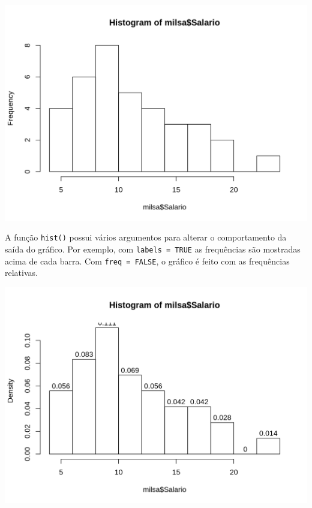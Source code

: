 \documentclass[10pt,a4paper]{book}
\newenvironment{Shaded}{\begin{snugshade}}{\end{snugshade}}
\newcommand{\KeywordTok}[1]{\textcolor[rgb]{0.13,0.29,0.53}{\textbf{#1}}}
\newcommand{\DataTypeTok}[1]{\textcolor[rgb]{0.13,0.29,0.53}{#1}}
\newcommand{\OtherTok}[1]{\textcolor[rgb]{0.56,0.35,0.01}{#1}}
\newcommand{\OperatorTok}[1]{\textcolor[rgb]{0.81,0.36,0.00}{\textbf{#1}}}
\newcommand{\NormalTok}[1]{#1}
\begin{document}
\begin{center}\includegraphics{figures/unnamed-chunk-308-1} \end{center}

A função \texttt{hist()} possui vários argumentos para alterar o
comportamento da saída do gráfico. Por exemplo, com
\texttt{labels\ =\ TRUE} as frequências são mostradas acima de cada
barra. Com \texttt{freq\ =\ FALSE}, o gráfico é feito com as frequências
relativas.

\begin{Shaded}
\end{Shaded}

\begin{center}\includegraphics{figures/unnamed-chunk-309-1} \end{center}
\end{document}
